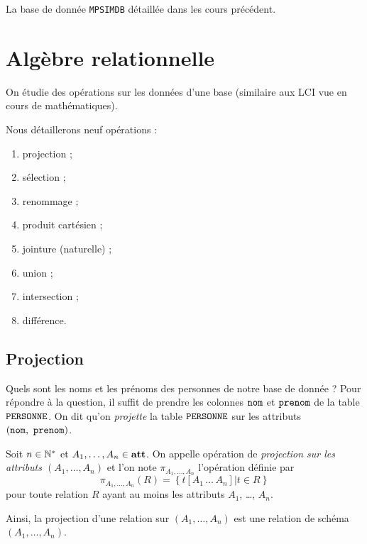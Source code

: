 \begin{exemple}
  La base de donnée \texttt{MPSIMDB} détaillée dans les cours précédent.
\end{exemple}

\section{Algèbre relationnelle}

On étudie des opérations sur les données d'une base (similaire aux LCI vue en cours de mathématiques).

Nous détaillerons neuf opérations :
\begin{enumerate}
\item projection ;
\item sélection ;
\item renommage ;
\item produit cartésien ;
\item jointure (naturelle) ;
\item union ;
\item intersection ;
\item différence.
\end{enumerate}

\subsection{Projection}

Quels sont les noms et les prénoms des personnes de notre base de donnée ? Pour répondre à la question, il suffit de prendre les colonnes
$\mathtt{nom}$ et $\mathtt{prenom}$ de la table $\mathtt{PERSONNE}{}$. On dit qu'on \emph{projette} la
table $\mathtt{PERSONNE}$ sur les attributs $(\mathtt{nom},\ \mathtt{prenom})$.

\begin{defi}[Projection]
  Soit $n\in \mathbb{N}^{*}$ et $A_{1}, \ldots{}, A_{n}\in
  \mathbf{att}$. On appelle opération de \emph{projection sur les attributs
    $(A_{1}, \ldots, A_{n})$}
  et l'on note $\pi_{A_{1},\ldots,A_{n}}$ l'opération définie par
  \begin{equation*}
    \pi_{A_{1},\ldots,A_{n}}(R) = \left\{t[A_{1}\,\ldots\,A_{n}] | t \in R \right\}
  \end{equation*}
  pour toute relation $R$ ayant au moins les attributs $A_{1}$,
  \ldots{}, $A_{n}$.
  
  Ainsi, la projection d'une relation sur $(A_{1}, \ldots{}, A_{n})$ est une relation de schéma $(A_1,\dots,A_n)$.
\end{defi}

